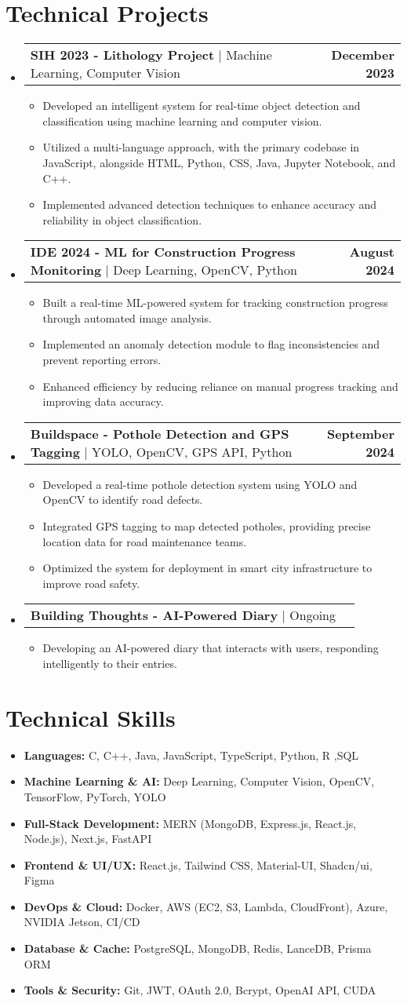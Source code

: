 \documentclass[letterpaper,11pt]{article}
\makeatletter
\newcommand{\resumeItem}[1]{
  \item\small{
    {#1 \vspace{-2pt}}
  }
}
\newcommand{\resumeProjectHeading}[2]{
  \item
  \begin{tabular*}{1.0\textwidth}{l@{\extracolsep{\fill}}r}
    \small#1 & \textbf{\small #2}\\
  \end{tabular*}\vspace{-7pt}
}
\newcommand{\resumeSubHeadingListStart}{\begin{itemize}[leftmargin=0.0in, label={}]}
\newcommand{\resumeSubHeadingListEnd}{\end{itemize}}
\newcommand{\resumeItemListStart}{\begin{itemize}}
\newcommand{\resumeItemListEnd}{\end{itemize}\vspace{-5pt}}
\makeatother
\begin{document}
\section{Technical Projects}
\resumeSubHeadingListStart
  \resumeProjectHeading
    {\textbf{SIH 2023 - Lithology Project} $|$ Machine Learning, Computer Vision}{December 2023}
    \resumeItemListStart
      \resumeItem{Developed an intelligent system for real-time object detection and classification using machine learning and computer vision.}
      \resumeItem{Utilized a multi-language approach, with the primary codebase in JavaScript, alongside HTML, Python, CSS, Java, Jupyter Notebook, and C++.}
      \resumeItem{Implemented advanced detection techniques to enhance accuracy and reliability in object classification.}
    \resumeItemListEnd

  \resumeProjectHeading
    {\textbf{IDE 2024 - ML for Construction Progress Monitoring} $|$ Deep Learning, OpenCV, Python}{August 2024}
    \resumeItemListStart
      \resumeItem{Built a real-time ML-powered system for tracking construction progress through automated image analysis.}
      \resumeItem{Implemented an anomaly detection module to flag inconsistencies and prevent reporting errors.}
      \resumeItem{Enhanced efficiency by reducing reliance on manual progress tracking and improving data accuracy.}
    \resumeItemListEnd

  \resumeProjectHeading
    {\textbf{Buildspace - Pothole Detection and GPS Tagging} $|$ YOLO, OpenCV, GPS API, Python}{September 2024}
    \resumeItemListStart
      \resumeItem{Developed a real-time pothole detection system using YOLO and OpenCV to identify road defects.}
      \resumeItem{Integrated GPS tagging to map detected potholes, providing precise location data for road maintenance teams.}
      \resumeItem{Optimized the system for deployment in smart city infrastructure to improve road safety.}
    \resumeItemListEnd

  \resumeProjectHeading
    {\textbf{Building Thoughts - AI-Powered Diary} $|$ Ongoing}{}
    \resumeItemListStart
      \resumeItem{Developing an AI-powered diary that interacts with users, responding intelligently to their entries.}
    \resumeItemListEnd
\resumeSubHeadingListEnd

\section{Technical Skills}
\resumeSubHeadingListStart
  \resumeItem{\textbf{Languages:} C, C++, Java, JavaScript, TypeScript, Python, R ,SQL}
  \resumeItem{\textbf{Machine Learning \& AI:} Deep Learning, Computer Vision, OpenCV, TensorFlow, PyTorch, YOLO}
  \resumeItem{\textbf{Full-Stack Development:} MERN (MongoDB, Express.js, React.js, Node.js), Next.js, FastAPI}
  \resumeItem{\textbf{Frontend \& UI/UX:} React.js, Tailwind CSS, Material-UI, Shadcn/ui, Figma}
  \resumeItem{\textbf{DevOps \& Cloud:} Docker, AWS (EC2, S3, Lambda, CloudFront), Azure, NVIDIA Jetson, CI/CD}
  \resumeItem{\textbf{Database \& Cache:} PostgreSQL, MongoDB, Redis, LanceDB, Prisma ORM}
  \resumeItem{\textbf{Tools \& Security:} Git, JWT, OAuth 2.0, Bcrypt, OpenAI API, CUDA}
\resumeSubHeadingListEnd
\end{document}

